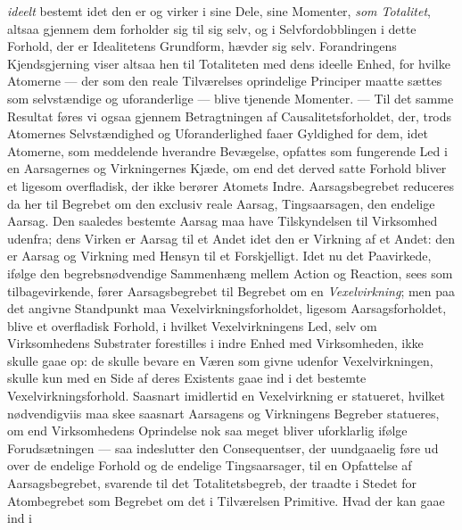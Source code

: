 \emph{ideelt} bestemt idet den er og virker i sine Dele, sine Momenter,
\emph{som Totalitet}, altsaa gjennem dem forholder sig til sig selv, og i
Selvfordobblingen i dette Forhold, der er Idealitetens Grundform, hævder sig
selv. Forandringens Kjendsgjerning viser altsaa hen til Totaliteten med dens
ideelle Enhed, for hvilke Atomerne --- der som den reale Tilværelses
oprindelige Principer maatte sættes som selvstændige og uforanderlige ---
blive tjenende Momenter. --- Til det samme Resultat føres vi ogsaa gjennem
Betragtningen af Causalitetsforholdet, der, trods Atomernes Selvstændighed og
Uforanderlighed faaer Gyldighed for dem, idet Atomerne, som meddelende
hverandre Bevægelse, opfattes som fungerende Led i en Aarsagernes og
Virkningernes Kjæde, om end det derved satte Forhold bliver et ligesom
overfladisk, der ikke berører Atomets Indre. Aarsagsbegrebet reduceres da her
til Begrebet om den exclusiv reale Aarsag, Tingsaarsagen, den endelige Aarsag.
Den saaledes bestemte Aarsag maa have Tilskyndelsen til Virksomhed udenfra;
dens Virken er Aarsag til et Andet idet den er Virkning af et
 Andet: den er Aarsag og Virkning med Hensyn til et Forskjelligt. Idet nu det
Paavirkede, ifølge den begrebsnødvendige Sammenhæng mellem Action og
Reaction, sees som tilbagevirkende, fører Aarsagsbegrebet til Begrebet om en
\emph{Vexelvirkning}; men paa det angivne Standpunkt maa
Vexelvirkningsforholdet, ligesom Aarsagsforholdet, blive et overfladisk
Forhold, i hvilket Vexelvirkningens Led, selv om Virksomhedens Substrater
forestilles i indre Enhed med Virksomheden, ikke skulle gaae op: de skulle
bevare en Væren som givne udenfor Vexelvirkningen, skulle kun med en Side af
deres Existents gaae ind i det bestemte Vexelvirkningsforhold. Saasnart
imidlertid en Vexelvirkning er statueret, hvilket nødvendigviis maa skee
saasnart Aarsagens og Virkningens Begreber statueres, om end Virksomhedens
Oprindelse nok saa meget bliver uforklarlig ifølge Forudsætningen --- saa
indeslutter den Consequentser, der uundgaaelig føre ud over de endelige
Forhold og de endelige Tingsaarsager, til en Opfattelse af Aarsagsbegrebet,
svarende til det Totalitetsbegreb, der traadte i Stedet for Atombegrebet som
Begrebet om det i Tilværelsen Primitive. Hvad der kan gaae ind i
